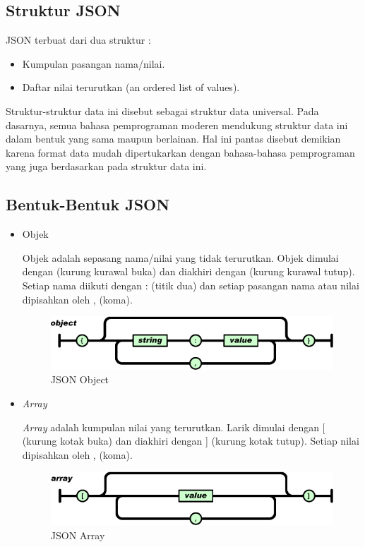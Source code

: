 \subsection{Struktur JSON}
\label{subsec:stukturjson}
JSON terbuat dari dua struktur :
\begin{itemize}
	\item Kumpulan pasangan nama/nilai.
	\item Daftar nilai terurutkan (an ordered list of values).
\end{itemize} 

Struktur-struktur data ini disebut sebagai struktur data universal. Pada dasarnya, semua bahasa pemprograman moderen mendukung struktur data ini dalam bentuk yang sama maupun berlainan. Hal ini pantas disebut demikian karena format data mudah dipertukarkan dengan bahasa-bahasa pemprograman yang juga berdasarkan pada struktur data ini.

\subsection{Bentuk-Bentuk JSON}
\label{subsec:bentukjson}
\begin{itemize}
	\item Objek
	
	Objek adalah sepasang nama/nilai yang tidak terurutkan. Objek dimulai dengan { (kurung kurawal buka) dan diakhiri dengan } (kurung kurawal tutup). Setiap nama diikuti dengan : (titik dua) dan setiap pasangan nama atau nilai dipisahkan oleh , (koma).
	\begin{figure}[H]
		\centering		
		\includegraphics[scale=0.4]{Gambar/object.png}
		\caption[JSON Object]{JSON Object}
		\label{fig:jsonobject}	
	\end{figure}
	\item \textit{Array}
	
	\textit{Array} adalah kumpulan nilai yang terurutkan. Larik dimulai dengan [ (kurung kotak buka) dan diakhiri dengan ] (kurung kotak tutup). Setiap nilai dipisahkan oleh , (koma).
	\begin{figure}[H]
		\centering		
		\includegraphics[scale=0.4]{Gambar/array.png}
		\caption[JSON Object]{JSON Array}
		\label{fig:jsonarray}	
	\end{figure}
\end{itemize} 

